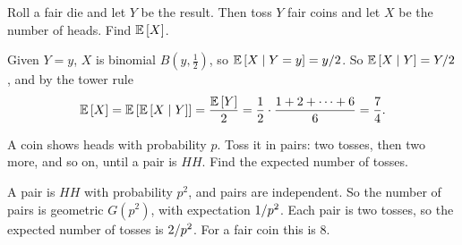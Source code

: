 \begin{exercisebox}
\begin{pproblem}\label{wp:tower}
    Roll a fair die and let $Y$ be the result. Then toss $Y$ fair coins and let $X$ be the number of
    heads. Find $\operatorname{\mathbb{E}}\left[X\right]$.
\end{pproblem}
\tcblower
\begin{wsolution}
    Given $Y = y$, $X$ is binomial $B(y, \frac{1}{2})$, so $\operatorname{\mathbb{E}}\left[X \mid Y = y\right] = y/2$.
    So $\operatorname{\mathbb{E}}\left[X \mid Y\right] = Y/2$, and by the tower rule
    \[\operatorname{\mathbb{E}}\left[X\right] = \operatorname{\mathbb{E}}\left[\operatorname{\mathbb{E}}\left[X \mid Y\right]\right] = \frac{\operatorname{\mathbb{E}}\left[Y\right]}{2}
        = \frac{1}{2} \cdot \frac{1 + 2 + \dots + 6}{6} = \frac{7}{4}.\]
\end{wsolution}
\end{exercisebox}

\begin{exercisebox}
\begin{pproblem}\label{wp:twoheads}
    A coin shows heads with probability $p$. Toss it in pairs: two tosses, then two more, and so
    on, until a pair is $HH$. Find the expected number of tosses.
\end{pproblem}
\tcblower
\begin{wsolution}
    A pair is $HH$ with probability $p^2$, and pairs are independent. So the number of pairs is
    geometric $G(p^2)$, with expectation $1/p^2$. Each pair is two tosses, so the expected
    number of tosses is $2/p^2$. For a fair coin this is $8$.
\end{wsolution}
\end{exercisebox}
